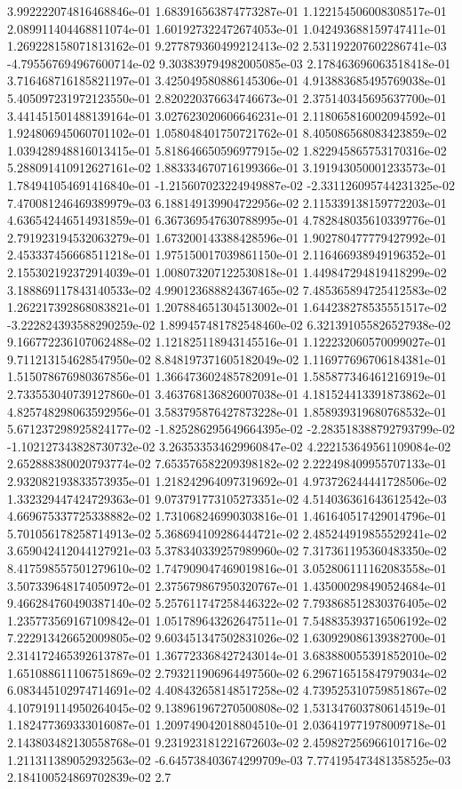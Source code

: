 3.992222074816468846e-01	1.683916563874773287e-01	1.122154506008308517e-01	2.089911404468811074e-01	1.601927322472674053e-01	1.042493688159747411e-01	1.269228158071813162e-01	9.277879360499212413e-02	2.531192207602286741e-03	-4.795567694967600714e-02	9.303839794982005085e-03	2.178463696063518418e-01	3.716468716185821197e-01	3.425049580886145306e-01	4.913883685495769038e-01	5.405097231972123550e-01	2.820220376634746673e-01	2.375140345695637700e-01	3.441451501488139164e-01	3.027623020606646231e-01	2.118065816002094592e-01	1.924806945060701102e-01	1.058048401750721762e-01	8.405086568083423859e-02	1.039428948816013415e-01	5.818646650596977915e-02	1.822945865753170316e-02	5.288091410912627161e-02	1.883334670716199366e-01	3.191943050001233573e-01	1.784941054691416840e-01	-1.215607023224949887e-02	-2.331126095744231325e-02	7.470081246469389979e-03	6.188149139904722956e-02	2.115339138159772203e-01	4.636542446514931859e-01	6.367369547630788995e-01	4.782848035610339776e-01	2.791923194532063279e-01	1.673200143388428596e-01	1.902780477779427992e-01	2.453337456668511218e-01	1.975150017039861150e-01	2.116466938949196352e-01	2.155302192372914039e-01	1.008073207122530818e-01	1.449847294819418299e-02	3.188869117843140533e-02	4.990123688824367465e-02	7.485365894725412583e-02	1.262217392868083821e-01	1.207884651304513002e-01	1.644238278535551517e-02	-3.222824393588290259e-02	1.899457481782548460e-02	6.321391055826527938e-02	9.166772236107062488e-02	1.121825118943145516e-01	1.122232060570099027e-01	9.711213154628547950e-02	8.848197371605182049e-02	1.116977696706184381e-01	1.515078676980367856e-01	1.366473602485782091e-01	1.585877346461216919e-01	2.733553040739127860e-01	3.463768136826007038e-01	4.181524413391873862e-01	4.825748298063592956e-01	3.583795876427873228e-01	1.858939319680768532e-01	5.671237298925824177e-02	-1.825286295649664395e-02	-2.283518388792793799e-02	-1.102127343828730732e-02	3.263533534629960847e-02	4.222153649561109084e-02	2.652888380020793774e-02	7.653576582209398182e-02	2.222498409955707133e-01	2.932082193833573935e-01	1.218242964097319692e-01	4.973726244441728506e-02	1.332329447424729363e-01	9.073791773105273351e-02	4.514036361643612542e-03	4.669675337725338882e-02	1.731068246990303816e-01	1.461640517429014796e-01	5.701056178258714913e-02	5.368694109286444721e-02	2.485244919855529241e-02	3.659042412044127921e-03	5.378340339257989960e-02	7.317361195360483350e-02	8.417598557501279610e-02	1.747909047469019816e-01	3.052806111162083558e-01	3.507339648174050972e-01	2.375679867950320767e-01	1.435000298490524684e-01	9.466284760490387140e-02	5.257611747258446322e-02	7.793868512830376405e-02	1.235773569167109842e-01	1.051789643262647511e-01	7.548835393716506192e-02	7.222913426652009805e-02	9.603451347502831026e-02	1.630929086139382700e-01	2.314172465392613787e-01	1.367723368427243014e-01	3.683880055391852010e-02	1.651088611106751869e-02	2.793211906964497560e-02	6.296716515847979034e-02	6.083445102974714691e-02	4.408432658148517258e-02	4.739525310759851867e-02	4.107919114950264045e-02	9.138961967270500808e-02	1.531347603780614519e-01	1.182477369333016087e-01	1.209749042018804510e-01	2.036419771978009718e-01	2.143803482130558768e-01	9.231923181221672603e-02	2.459827256966101716e-02	1.211311389052932563e-02	-6.645738403674299709e-03	7.774195473481358525e-03	2.184100524869702839e-02	2.7